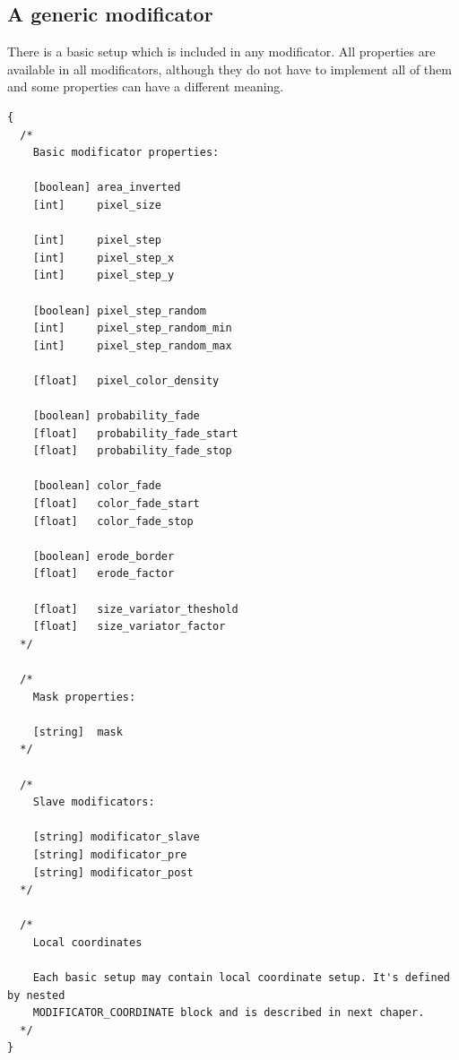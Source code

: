 \documentclass[9pt]{article}
\begin{document}
\subsection{A generic modificator}
There is a basic setup which is included in any modificator.
All properties are available in all modificators,
although they do not have to implement all of them
and some properties can have a different meaning.
\begin{verbatim}
{
  /*
    Basic modificator properties:
  
    [boolean] area_inverted
    [int]     pixel_size
    
    [int]     pixel_step
    [int]     pixel_step_x
    [int]     pixel_step_y
  
    [boolean] pixel_step_random
    [int]     pixel_step_random_min
    [int]     pixel_step_random_max
    
    [float]   pixel_color_density
    
    [boolean] probability_fade
    [float]   probability_fade_start
    [float]   probability_fade_stop
  
    [boolean] color_fade
    [float]   color_fade_start
    [float]   color_fade_stop
      
    [boolean] erode_border
    [float]   erode_factor
    
    [float]   size_variator_theshold
    [float]   size_variator_factor
  */    
    
  /*
    Mask properties:
    
    [string]  mask
  */
    
  /*
    Slave modificators:
  
    [string] modificator_slave
    [string] modificator_pre
    [string] modificator_post
  */  

  /*
    Local coordinates
    
    Each basic setup may contain local coordinate setup. It's defined by nested 
    MODIFICATOR_COORDINATE block and is described in next chaper.
  */
}
\end{verbatim}
\end{document}
